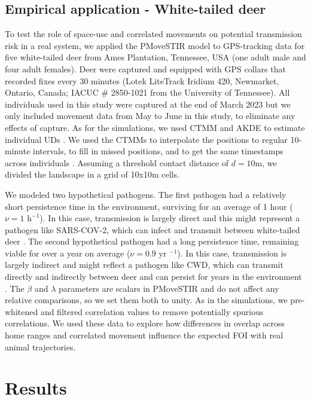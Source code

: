 \documentclass[letterpaper]{article}
\begin{document}
\subsection*{Empirical application - White-tailed deer}

To test the role of space-use and correlated movements on potential transmission risk in a real system, we applied the PMoveSTIR model to GPS-tracking data for five white-tailed deer from Ames Plantation, Tennessee, USA (one adult male and four adult females). 
Deer were captured and equipped with GPS collars that recorded fixes every 30 minutes (Lotek LiteTrack Iridium 420, Newmarket, Ontario, Canada; IACUC \# 2850-1021 from the University of Tennessee).  All individuals used in this study were captured at the end of March 2023 but we only included movement data from May to June in this study, to eliminate any effects of capture.  As for the simulations, we used CTMM and AKDE to estimate individual UDs \citep{Calabrese2016}. We used the CTMMs to interpolate the positions to regular 10-minute intervals, to fill in missed positions, and to get the same timestamps across individuals \citep{Yang2023}.  Assuming a threshold contact distance of $d=10$m, we divided the landscape in a grid of 10x10m cells. 

We modeled two hypothetical pathogens. The first pathogen had a relatively short persistence time in the environment, surviving for an average of 1 hour  ($\nu=1\text{ h}^{-1 }$). In this case, transmission is largely direct and this might represent a pathogen like SARS-COV-2, which can infect and transmit between white-tailed deer \citep{Hale2022}. The second hypothetical pathogen had a long persistence time, remaining viable for over a year on average ($\nu=0.9 \text{ yr }^{-1}$). In this case, transmission is largely indirect and might reflect a pathogen like CWD, which can transmit directly and indirectly between deer and can persist for years in the environment \citep{Saunders2012a}. The $\beta$ and $\lambda$ parameters are scalars in PMoveSTIR and do not affect any relative comparisons, so we set them both to unity. As in the simulations, we pre-whitened and filtered correlation values to remove potentially spurious correlations. 
We used these data to explore how differences in overlap across home ranges and correlated movement influence the expected FOI with real animal trajectories.

\section*{Results}
\end{document}
